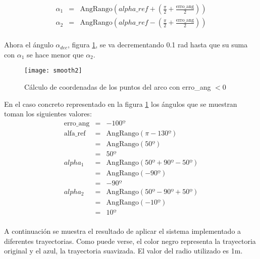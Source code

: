 \begin{eqnarray*}
\alpha_{1}  & = & \mbox{AngRango} \left ( alpha\_ref +
   \left (\frac{\pi}{2} + \frac{\mbox{erro\_ang}}{2} \right ) \right )\\
 \alpha_{2}  & = & \mbox{AngRango} \left ( alpha\_ref -
   \left (\frac{\pi}{2} + \frac{\mbox{erro\_ang}}{2} \right ) \right )\\
\end{eqnarray*}

Ahora el ángulo $\alpha_{dec}$, figura \ref{fg:smooth2}, se va decrementando 0.1 rad hasta que su suma con $\alpha_{1}$ se hace menor que $\alpha_{2}$.

\begin{figure}[hbt]
  \centering\texttt{[image: smooth2]}\\
  \caption{Cálculo de coordenadas de los puntos del arco con erro\_ang $< 0$}\label{fg:smooth2}
\end{figure}

En el caso concreto representado en la figura \ref{fg:smooth2} los ángulos que se muestran toman los siguientes valores:
\begin{eqnarray*}
\mbox{erro\_ang}  & = & -100º \\
\mbox{alfa\_ref}     &=  & \mbox{AngRango} (\pi - 130º)\\
                                  & = &\mbox{AngRango} (50º) \\
                                  & = & 50º\\
alpha_{1}                &= & \mbox{AngRango} (50º + 90º - 50º)\\
                                 & = & \mbox{AngRango} (-90º)\\
                                 & = & -90º\\
alpha_{2}                &= & \mbox{AngRango} (50º - 90º + 50º)\\
                                 & = & \mbox{AngRango} (-10º)\\
                                 & = & 10º\\
\end{eqnarray*}

\clearpage

A continuación se muestra el resultado de aplicar el sistema implementado a diferentes trayectorias. Como puede verse, el color negro representa la trayectoria original y el azul, la trayectoria suavizada. El valor del radio utilizado es 1m.

